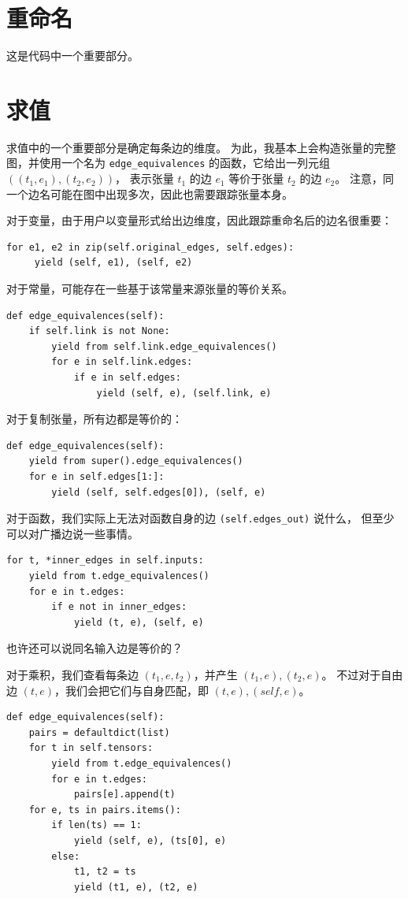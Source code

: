 \section{重命名}
这是代码中一个重要部分。

\section{求值}

求值中的一个重要部分是确定每条边的维度。
为此，我基本上会构造张量的完整图，并使用一个名为
\texttt{edge\_equivalences} 的函数，它给出一列元组 $((t_1, e_1), (t_2, e_2))$，
表示张量 $t_1$ 的边 $e_1$ 等价于张量 $t_2$ 的边 $e_2$。
注意，同一个边名可能在图中出现多次，因此也需要跟踪张量本身。

对于变量，由于用户以变量形式给出边维度，因此跟踪重命名后的边名很重要：
\begin{lstlisting}
for e1, e2 in zip(self.original_edges, self.edges):
     yield (self, e1), (self, e2)
\end{lstlisting}

对于常量，可能存在一些基于该常量来源张量的等价关系。
\begin{lstlisting}
def edge_equivalences(self):
    if self.link is not None:
        yield from self.link.edge_equivalences()
        for e in self.link.edges:
            if e in self.edges:
                yield (self, e), (self.link, e)
\end{lstlisting}

对于复制张量，所有边都是等价的：
\begin{lstlisting}
def edge_equivalences(self):
    yield from super().edge_equivalences()
    for e in self.edges[1:]:
        yield (self, self.edges[0]), (self, e)
\end{lstlisting}

对于函数，我们实际上无法对函数自身的边 \texttt{(self.edges\_out)} 说什么，
但至少可以对广播边说一些事情。
\begin{lstlisting}
for t, *inner_edges in self.inputs:
    yield from t.edge_equivalences()
    for e in t.edges:
        if e not in inner_edges:
            yield (t, e), (self, e)
\end{lstlisting}
也许还可以说同名输入边是等价的？

对于乘积，我们查看每条边 $(t_1, e, t_2)$，并产生 $(t_1, e), (t_2, e)$。
不过对于自由边 $(t, e)$，我们会把它们与自身匹配，即 $(t, e), (self, e)$。
\begin{lstlisting}
def edge_equivalences(self):
    pairs = defaultdict(list)
    for t in self.tensors:
        yield from t.edge_equivalences()
        for e in t.edges:
            pairs[e].append(t)
    for e, ts in pairs.items():
        if len(ts) == 1:
            yield (self, e), (ts[0], e)
        else:
            t1, t2 = ts
            yield (t1, e), (t2, e)
\end{lstlisting}

